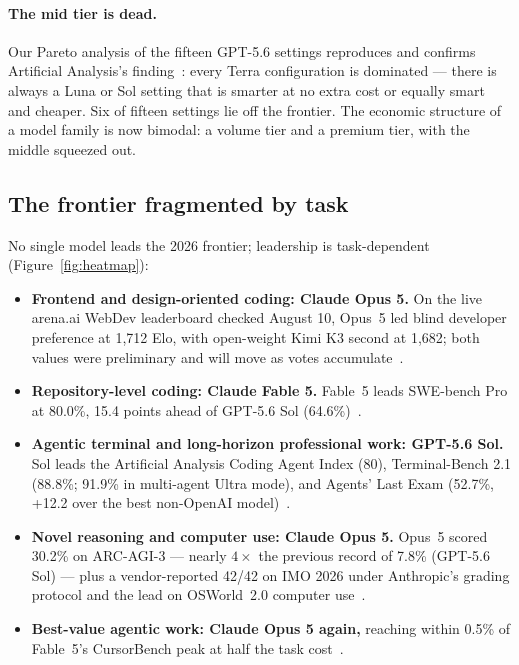 \paragraph{The mid tier is dead.} Our Pareto analysis of the fifteen
GPT-5.6 settings reproduces and confirms Artificial Analysis's
finding~\cite{gist2026aa56,aa2026gpt56}: every Terra configuration is dominated
--- there is always a Luna or Sol setting that is smarter at no extra cost or
equally smart and cheaper. Six of fifteen settings lie off the frontier. The
economic structure of a model family is now bimodal: a volume tier and a
premium tier, with the middle squeezed out.

\subsection{The frontier fragmented by task}\label{sec:specialization}

No single model leads the 2026 frontier; leadership is task-dependent
(Figure~\ref{fig:heatmap}):

\begin{itemize}
    \item \textbf{Frontend and design-oriented coding: Claude Opus 5.} On the
    live arena.ai WebDev leaderboard checked August 10, Opus~5 led blind
    developer preference at 1,712 Elo, with open-weight Kimi K3 second at
    1,682; both values were preliminary and will move as votes
    accumulate~\cite{arena2026webdev}.
    \item \textbf{Repository-level coding: Claude Fable 5.} Fable~5 leads
    SWE-bench Pro at 80.0\%, 15.4 points ahead of GPT-5.6 Sol
    (64.6\%)~\cite{openai2026gpt56}.
    \item \textbf{Agentic terminal and long-horizon professional work:
    GPT-5.6 Sol.} Sol leads the Artificial Analysis Coding Agent Index (80),
    Terminal-Bench 2.1 (88.8\%; 91.9\% in multi-agent Ultra mode), and Agents'
    Last Exam (52.7\%, +12.2 over the best non-OpenAI
    model)~\cite{aa2026gpt56,openai2026gpt56}.
    \item \textbf{Novel reasoning and computer use: Claude Opus 5.} Opus~5
    scored 30.2\% on ARC-AGI-3 --- nearly $4\times$ the previous record of
    7.8\% (GPT-5.6 Sol) --- plus a vendor-reported 42/42 on IMO 2026 under
    Anthropic's grading protocol and the lead on
    OSWorld~2.0 computer use~\cite{anthropic2026opus5,anthropic2026opus5card,arcprize2026opus5}.
    \item \textbf{Best-value agentic work: Claude Opus 5 again,} reaching
    within 0.5\% of Fable~5's CursorBench peak at half the task
    cost~\cite{anthropic2026opus5}.
\end{itemize}


